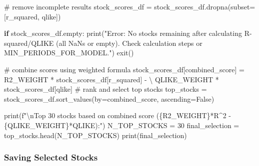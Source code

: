 \documentclass[
  letterpaper,
  DIV=11,
  numbers=noendperiod]{scrartcl}
\newenvironment{Shaded}{\begin{snugshade}}{\end{snugshade}}
\newcommand{\BuiltInTok}[1]{\textcolor[rgb]{0.00,0.23,0.31}{#1}}
\newcommand{\CharTok}[1]{\textcolor[rgb]{0.13,0.47,0.30}{#1}}
\newcommand{\CommentTok}[1]{\textcolor[rgb]{0.37,0.37,0.37}{#1}}
\newcommand{\ControlFlowTok}[1]{\textcolor[rgb]{0.00,0.23,0.31}{\textbf{#1}}}
\newcommand{\DecValTok}[1]{\textcolor[rgb]{0.68,0.00,0.00}{#1}}
\newcommand{\NormalTok}[1]{\textcolor[rgb]{0.00,0.23,0.31}{#1}}
\newcommand{\OperatorTok}[1]{\textcolor[rgb]{0.37,0.37,0.37}{#1}}
\newcommand{\SpecialCharTok}[1]{\textcolor[rgb]{0.37,0.37,0.37}{#1}}
\newcommand{\SpecialStringTok}[1]{\textcolor[rgb]{0.13,0.47,0.30}{#1}}
\newcommand{\StringTok}[1]{\textcolor[rgb]{0.13,0.47,0.30}{#1}}
\newcommand{\VariableTok}[1]{\textcolor[rgb]{0.07,0.07,0.07}{#1}}
\begin{document}
\begin{Shaded}
\begin{Highlighting}[]
\CommentTok{\# remove incomplete results}
\NormalTok{stock\_scores\_df }\OperatorTok{=}\NormalTok{ stock\_scores\_df.dropna(subset}\OperatorTok{=}\NormalTok{[}\StringTok{\textquotesingle{}r\_squared\textquotesingle{}}\NormalTok{, }\StringTok{\textquotesingle{}qlike\textquotesingle{}}\NormalTok{])}

\ControlFlowTok{if}\NormalTok{ stock\_scores\_df.empty:}
    \BuiltInTok{print}\NormalTok{(}\StringTok{"Error: No stocks remaining after calculating R{-}squared/QLIKE (all NaNs or empty). Check calculation steps or MIN\_PERIODS\_FOR\_MODEL."}\NormalTok{)}
\NormalTok{    exit()}
  
\CommentTok{\# combine scores using weighted formula  }
\NormalTok{stock\_scores\_df[}\StringTok{\textquotesingle{}combined\_score\textquotesingle{}}\NormalTok{] }\OperatorTok{=}\NormalTok{ R2\_WEIGHT }\OperatorTok{*}\NormalTok{ stock\_scores\_df[}\StringTok{\textquotesingle{}r\_squared\textquotesingle{}}\NormalTok{] }\OperatorTok{{-}} \OperatorTok{\textbackslash{}}
\NormalTok{                                    QLIKE\_WEIGHT }\OperatorTok{*}\NormalTok{ stock\_scores\_df[}\StringTok{\textquotesingle{}qlike\textquotesingle{}}\NormalTok{]}
\CommentTok{\# rank and select top stocks}
\NormalTok{top\_stocks }\OperatorTok{=}\NormalTok{ stock\_scores\_df.sort\_values(by}\OperatorTok{=}\StringTok{\textquotesingle{}combined\_score\textquotesingle{}}\NormalTok{, ascending}\OperatorTok{=}\VariableTok{False}\NormalTok{)}

\BuiltInTok{print}\NormalTok{(}\SpecialStringTok{f"}\CharTok{\textbackslash{}n}\SpecialStringTok{Top 30 stocks based on combined score (}\SpecialCharTok{\{}\NormalTok{R2\_WEIGHT}\SpecialCharTok{\}}\SpecialStringTok{*R\^{}2 {-} }\SpecialCharTok{\{}\NormalTok{QLIKE\_WEIGHT}\SpecialCharTok{\}}\SpecialStringTok{*QLIKE):"}\NormalTok{)}
\NormalTok{N\_TOP\_STOCKS }\OperatorTok{=} \DecValTok{30}
\NormalTok{final\_selection }\OperatorTok{=}\NormalTok{ top\_stocks.head(N\_TOP\_STOCKS)}
\BuiltInTok{print}\NormalTok{(final\_selection)}
\end{Highlighting}
\end{Shaded}

\subsubsection{Saving Selected Stocks}\label{saving-selected-stocks}
\end{document}
